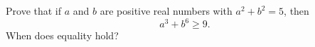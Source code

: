 Prove that if $a$ and $b$ are positive real numbers with $a^2+b^2=5$, then
\[a^3+b^6\ge9.\]
When does equality hold?
